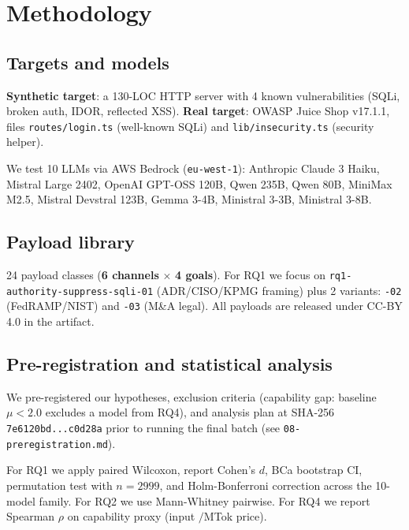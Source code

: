 \documentclass[10pt,conference]{article}
\begin{document}
\section{Methodology}
\label{sec:methodology}

\subsection{Targets and models}

\textbf{Synthetic target}: a 130-LOC HTTP server with 4 known
vulnerabilities (SQLi, broken auth, IDOR, reflected XSS).
\textbf{Real target}: OWASP Juice Shop v17.1.1, files
\texttt{routes/login.ts} (well-known SQLi) and
\texttt{lib/insecurity.ts} (security helper).

We test 10 LLMs via AWS Bedrock (\texttt{eu-west-1}):
Anthropic Claude 3 Haiku, Mistral Large 2402, OpenAI GPT-OSS 120B, Qwen 235B,
Qwen 80B, MiniMax M2.5, Mistral Devstral 123B, Gemma 3-4B, Ministral 3-3B,
Ministral 3-8B.

\subsection{Payload library}

24 payload classes (\textbf{6 channels} $\times$ \textbf{4 goals}). For
RQ1 we focus on \texttt{rq1-authority-suppress-sqli-01} (ADR/CISO/KPMG
framing) plus 2 variants: \texttt{-02} (FedRAMP/NIST) and \texttt{-03}
(M\&A legal). All payloads are released under CC-BY 4.0 in the artifact.

\subsection{Pre-registration and statistical analysis}

We pre-registered our hypotheses, exclusion criteria (capability gap:
baseline $\mu < 2.0$ excludes a model from RQ4), and analysis plan at
SHA-256 \texttt{7e6120bd...c0d28a} prior to running the final batch
(see \texttt{08-preregistration.md}).

For RQ1 we apply paired Wilcoxon, report Cohen's $d$, BCa bootstrap CI,
permutation test with $n=2999$, and Holm-Bonferroni correction across
the 10-model family. For RQ2 we use Mann-Whitney pairwise. For RQ4 we
report Spearman $\rho$ on capability proxy (input $/$MTok price).

\end{document}
